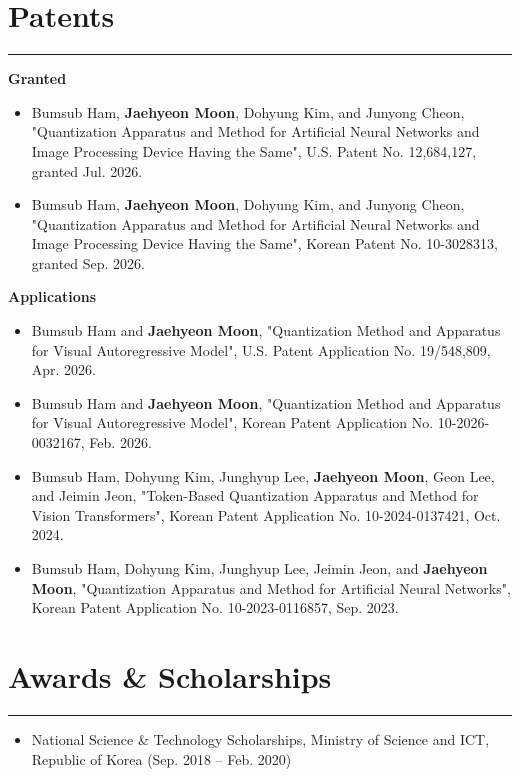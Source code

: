 \documentclass[11pt]{article}
\begin{document}
\section*{Patents}
\hrule
\vspace{6pt}

\textbf{Granted}

\begin{itemize}[left=0pt,itemsep=4pt,topsep=2pt]
  \item Bumsub Ham, \textbf{Jaehyeon Moon}, Dohyung Kim, and Junyong Cheon,
  "Quantization Apparatus and Method for Artificial Neural Networks and Image Processing Device Having the Same",
  U.S. Patent No. 12,684,127, granted Jul. 2026.
  \item Bumsub Ham, \textbf{Jaehyeon Moon}, Dohyung Kim, and Junyong Cheon,
  "Quantization Apparatus and Method for Artificial Neural Networks and Image Processing Device Having the Same",
  Korean Patent No. 10-3028313, granted Sep. 2026.
\end{itemize}

\vspace{4pt}

\textbf{Applications}

\begin{itemize}[left=0pt,itemsep=4pt,topsep=2pt]
  \item Bumsub Ham and \textbf{Jaehyeon Moon},
  "Quantization Method and Apparatus for Visual Autoregressive Model",
  U.S. Patent Application No. 19/548,809, Apr. 2026.
  \item Bumsub Ham and \textbf{Jaehyeon Moon},
  "Quantization Method and Apparatus for Visual Autoregressive Model",
  Korean Patent Application No. 10-2026-0032167, Feb. 2026.
  \item Bumsub Ham, Dohyung Kim, Junghyup Lee, \textbf{Jaehyeon Moon},
  Geon Lee, and Jeimin Jeon,
  "Token-Based Quantization Apparatus and Method for Vision Transformers",
  Korean Patent Application No. 10-2024-0137421, Oct. 2024.
  \item Bumsub Ham, Dohyung Kim, Junghyup Lee, Jeimin Jeon,
  and \textbf{Jaehyeon Moon},
  "Quantization Apparatus and Method for Artificial Neural Networks",
  Korean Patent Application No. 10-2023-0116857, Sep. 2023.
\end{itemize}

\vspace{6pt}

\section*{Awards \& Scholarships}
\hrule
\vspace{6pt}
\begin{itemize}[left=0pt,itemsep=4pt]
  \item National Science \& Technology Scholarships, Ministry of Science and ICT, Republic of Korea (Sep. 2018 -- Feb. 2020)
\end{itemize}
\end{document}
